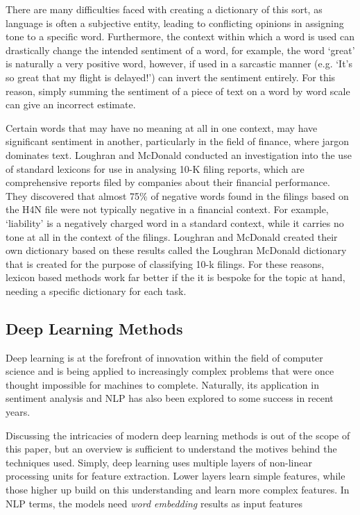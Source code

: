 \documentclass[ oneside,%
                    author={Joshua Felmeden},
                    degree={MEng},
                     title={Semantic Analysis of Financial Headlines Based on Realised Stock Returns},
                  subtitle={}]{dissertation}
\begin{document}
There are many difficulties faced with creating a dictionary of this sort, as language is often a subjective entity, leading to conflicting opinions in assigning tone to a specific word. Furthermore, the context within which a word is used can drastically change the intended sentiment of a word, for example, the word `great' is naturally a very positive word, however, if used in a sarcastic manner (e.g. `It's so great that my flight is delayed!') can invert the sentiment entirely. For this reason, simply summing the sentiment of a piece of text on a word by word scale can give an incorrect estimate.

Certain words that may have no meaning at all in one context, may have significant sentiment in another, particularly in the field of finance, where jargon dominates text. Loughran and McDonald \cite{lm-dict} conducted an investigation into the use of standard lexicons for use in analysing 10-K filing reports, which are comprehensive reports filed by companies about their financial performance. They discovered that almost 75\% of negative words found in the filings based on the H4N file were not typically negative in a financial context. For example, `liability' is a negatively charged word in a standard context, while it carries no tone at all in the context of the filings. Loughran and McDonald created their own dictionary based on these results called the Loughran McDonald dictionary that is created for the purpose of classifying 10-k filings. For these reasons, lexicon based methods work far better if the it is bespoke for the topic at hand, needing a specific dictionary for each task. 

\subsection{Deep Learning Methods}
Deep learning is at the forefront of innovation within the field of computer science and is being applied to increasingly complex problems that were once thought impossible for machines to complete. Naturally, its application in sentiment analysis and NLP has also been explored to some success in recent years.

Discussing the intricacies of modern deep learning methods is out of the scope of this paper, but an overview is sufficient to understand the motives behind the techniques used. Simply, deep learning uses multiple layers of non-linear processing units for feature extraction. Lower layers learn simple features, while those higher up build on this understanding and learn more complex features. In NLP terms, the models need \textit{word embedding} results as input features 
\end{document}
